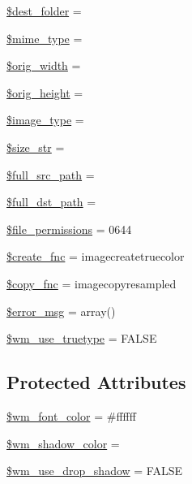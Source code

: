 \begin{DoxyCompactItemize}
\item 
\mbox{\hyperlink{class_c_i___image__lib_a23c580d10b1ba89c5b532f43fe2c6f59}{\$dest\+\_\+folder}} = \textquotesingle{}\textquotesingle{}
\item 
\mbox{\hyperlink{class_c_i___image__lib_a4d1985caafb49b059e3ca3dedfee257a}{\$mime\+\_\+type}} = \textquotesingle{}\textquotesingle{}
\item 
\mbox{\hyperlink{class_c_i___image__lib_a336a3be3539aaae0ad42aaf4c544bb41}{\$orig\+\_\+width}} = \textquotesingle{}\textquotesingle{}
\item 
\mbox{\hyperlink{class_c_i___image__lib_a68713f45d7d236dfdd6aafdc9668a44d}{\$orig\+\_\+height}} = \textquotesingle{}\textquotesingle{}
\item 
\mbox{\hyperlink{class_c_i___image__lib_a939d6733d998cce893403d2f59f40317}{\$image\+\_\+type}} = \textquotesingle{}\textquotesingle{}
\item 
\mbox{\hyperlink{class_c_i___image__lib_aff68567b98390e0db61065df80af5d49}{\$size\+\_\+str}} = \textquotesingle{}\textquotesingle{}
\item 
\mbox{\hyperlink{class_c_i___image__lib_a7ccf54c8f559eaf70600f69554be39eb}{\$full\+\_\+src\+\_\+path}} = \textquotesingle{}\textquotesingle{}
\item 
\mbox{\hyperlink{class_c_i___image__lib_aa830804dc9d15c51e0672bd4d3602e07}{\$full\+\_\+dst\+\_\+path}} = \textquotesingle{}\textquotesingle{}
\item 
\mbox{\hyperlink{class_c_i___image__lib_abeba5c64fb89ae12956958b88a58f9bf}{\$file\+\_\+permissions}} = 0644
\item 
\mbox{\hyperlink{class_c_i___image__lib_af70f0124d1a34ec7b7360bee16c3a3ea}{\$create\+\_\+fnc}} = \textquotesingle{}imagecreatetruecolor\textquotesingle{}
\item 
\mbox{\hyperlink{class_c_i___image__lib_a4c7eeae509bbd8ac493cafa8a5b9980e}{\$copy\+\_\+fnc}} = \textquotesingle{}imagecopyresampled\textquotesingle{}
\item 
\mbox{\hyperlink{class_c_i___image__lib_acf910733622c1fa671b9f755c69c2ec7}{\$error\+\_\+msg}} = array()
\item 
\mbox{\hyperlink{class_c_i___image__lib_a0415d8aa18349f21751f7a81255918ad}{\$wm\+\_\+use\+\_\+truetype}} = F\+A\+L\+SE
\end{DoxyCompactItemize}
\subsection*{Protected Attributes}
\begin{DoxyCompactItemize}
\item 
\mbox{\hyperlink{class_c_i___image__lib_ae9498442637ff2466d4426af45f68c6b}{\$wm\+\_\+font\+\_\+color}} = \textquotesingle{}\#ffffff\textquotesingle{}
\item 
\mbox{\hyperlink{class_c_i___image__lib_aca292b49514fe3238440675c4b2642ca}{\$wm\+\_\+shadow\+\_\+color}} = \textquotesingle{}\textquotesingle{}
\item 
\mbox{\hyperlink{class_c_i___image__lib_a49b77ed476cebe5f357705e7a9c4ccce}{\$wm\+\_\+use\+\_\+drop\+\_\+shadow}} = F\+A\+L\+SE
\end{DoxyCompactItemize}



